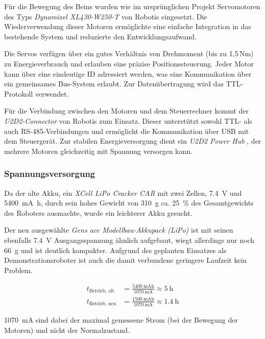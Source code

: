 Für die Bewegung des Beins wurden wie im ursprünglichen Projekt Servomotoren des Typs \textit{Dynamixel XL430-W250-T} von Robotis \cite{robotis_xl430} eingesetzt. Die Wiederverwendung dieser Motoren ermöglichte eine einfache Integration in das bestehende System und reduzierte den Entwicklungsaufwand. 

Die Servos verfügen über ein gutes Verhältnis von Drehmoment (bis zu 1{,}5\,Nm) zu Energieverbrauch und erlauben eine präzise Positionssteuerung. Jeder Motor kann über eine eindeutige ID adressiert werden, was eine Kommunikation über ein gemeinsames Bus-System erlaubt. Zur Datenübertragung wird das TTL-Protokoll verwendet.

Für die Verbindung zwischen den Motoren und dem Steuerrechner kommt der \textit{U2D2-Connector} von Robotis \cite{robotis_u2d2} zum Einsatz. Dieser unterstützt sowohl TTL- als auch RS-485-Verbindungen und ermöglicht die Kommunikation über USB mit dem Steuergerät. Zur stabilen Energieversorgung dient ein \textit{U2D2 Power Hub} \cite{robotis_u2d2_power_hub}, der mehrere Motoren gleichzeitig mit Spannung versorgen kann.


\subsubsection{Spannungsversorgung}

Da der alte Akku, ein \textit{XCell LiPo Cracker CAR} \cite{xcell_akku} mit zwei Zellen, \qty{7.4}{\volt} und \qty{5400}{\milli\ampere\hour}, durch sein hohes Gewicht von \qty{310}{\gram} ca. \qty{25}{\percent} des Gesamtgewichts des Roboters ausmachte, wurde ein leichterer Akku gesucht.

Der neu ausgewählte \textit{Gens ace Modellbau-Akkupack (LiPo)} \cite{gens_ace_akku} ist mit seinen ebenfalls \qty{7.4}{\volt} Ausgangsspannung ähnlich aufgebaut, wiegt allerdings nur noch \qty{66}{\gram} und ist deutlich kompakter. Aufgrund des geplanten Einsatzes als Demonstrationsroboter ist auch die damit verbundene geringere Laufzeit kein Problem.

\begin{align*}
t_{\text{Betrieb, alt}} &= \frac{\qty{5400}{\milli\ampere\hour}}{\qty{1070}{\milli\ampere}} \approx \qty{5}{\hour} \\
t_{\text{Betrieb, neu}} &= \frac{\qty{1500}{\milli\ampere\hour}}{\qty{1070}{\milli\ampere}} \approx \qty{1.4}{\hour}
\end{align*}

\qty{1070}{\milli\ampere} sind dabei der maximal gemessene Strom (bei der Bewegung der Motoren) und nicht der Normalzustand.

